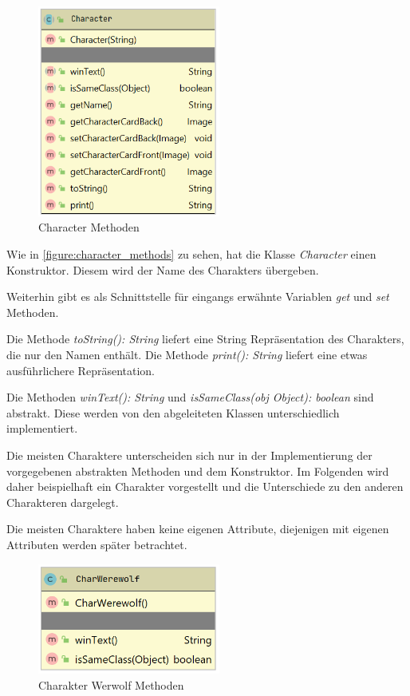 \begin{figure}[H]
	\centering
	\includegraphics[width=6cm]{architektur/character_methods.png}
	\caption{Character Methoden}
	\label{figure:character_methods}
\end{figure}

Wie in \autoref{figure:character_methods} zu sehen, hat die Klasse \textit{Character} einen Konstruktor. Diesem wird der Name des Charakters übergeben. 

\medskip
Weiterhin gibt es als Schnittstelle für eingangs erwähnte Variablen \textit{get} und \textit{set} Methoden. 

\medskip
Die Methode \textit{toString(): String} liefert eine String Repräsentation des Charakters, die nur den Namen enthält. 
Die Methode \textit{print(): String} liefert eine etwas ausführlichere Repräsentation. 

\medskip
Die Methoden \textit{winText(): String} und \textit{isSameClass(obj Object): boolean} sind abstrakt. Diese werden von den abgeleiteten Klassen unterschiedlich implementiert. 

\medskip
Die meisten Charaktere unterscheiden sich nur in der Implementierung der vorgegebenen abstrakten Methoden und dem Konstruktor. Im Folgenden wird daher beispielhaft ein Charakter vorgestellt und die Unterschiede zu den anderen Charakteren dargelegt. 

\medskip
Die meisten Charaktere haben keine eigenen Attribute, diejenigen mit eigenen Attributen werden später betrachtet. 

\begin{figure}[H]
	\centering
	\includegraphics[width=6cm]{architektur/characterWerewolf_methods.png}
	\caption{Charakter Werwolf Methoden}
	\label{figure:characterWerewolf_methods}
\end{figure}

